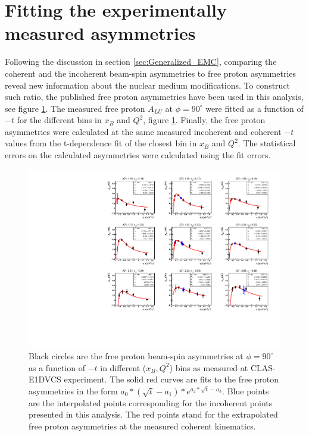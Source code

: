 \section{Fitting the experimentally measured asymmetries} \label{fit_int} 
Following the discussion in section \ref{sec:Generalized_EMC}, comparing the 
coherent and the incoherent beam-spin asymmetries to free proton asymmetries 
reveal new information about the nuclear medium modifications. To construct 
such ratio, the published free proton asymmetries \cite{FX_BSA} have been used 
in this analysis, see figure \ref{fig:free-proton-alu}. The measured free 
proton $A_{LU}$ at $\phi = 90^{\circ}$ were fitted as a function of $-t$ for 
the different bins in $x_B$ and $Q^2$, figure \ref{fig:free-proton-alu}.  
Finally, the free proton asymmetries were calculated at the same measured 
incoherent and coherent $-t$ values from the t-dependence fit of the closest 
bin in $x_B$ and $Q^2$.  The statistical errors on the calculated asymmetries 
were calculated using the fit errors.\\ 


\begin{figure}[tpb]
\centering
\includegraphics[scale=0.85]{fig_Dec2016/F_ALU-proton-fits.pdf}
\caption{Black circles are the free proton beam-spin asymmetries at $\phi = 90 
   ^{\circ}$ as a function of $-t$ in different ($x_B, Q^2$) bins as measured 
   at CLAS-E1DVCS experiment. The solid red curves are fits to the free proton 
   asymmetries in the form $a_{0}*(\sqrt{t}-a_{1})*e^{a_{2}*\sqrt{t} - a_{3}}$.
   Blue points are the interpolated points corresponding for the incoherent 
points presented in this analysis. The red points stand for the extrapolated 
free proton asymmetries at the measured coherent kinematics.}
\label{fig:free-proton-alu}
\end{figure}


